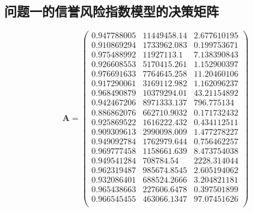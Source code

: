 \documentclass{cumcmthesis}
\begin{document}
\begin{appendices}

\section{问题一的信誉风险指数模型的决策矩阵}

\[
\mathbf{A} = \left(
\begin{array}{ccc}
0.947788005 & 11449458.14  & 2.677610195  \\
0.910869294 & 1733962.083  & 0.199753671  \\
0.975488992 & 11927113.1   & 7.138390843  \\
0.926608553 & 5170415.261  & 1.152900397  \\
0.976691633 & 7764645.258  & 11.20460106  \\
0.917290061 & 3169112.982  & 1.162096237  \\
0.968490879 & 10379294.01  & 43.21154892  \\
0.942467206 & 8971333.137  & 796.775134   \\
0.886862076 & 662710.9032  & 0.171732432  \\
0.925869522 & 1616222.432  & 0.434112511  \\
0.909309613 & 2990098.009  & 1.477278227  \\
0.949092784 & 1762979.644  & 0.756462257  \\
0.969777458 & 1158661.639  & 8.473754038  \\
0.949541284 & 708784.54    & 2228.314044  \\
0.962319487 & 985674.8545  & 2.605194062  \\
0.932086401 & 688524.2666  & 3.204821181  \\
0.965438663 & 227606.6478  & 0.397501899  \\
0.966545455 & 463066.1347  & 97.07451626  \\
\end{array} \right)
\]


\end{appendices}
\end{document}

